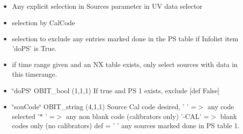 \begin{itemize}
\item Any explicit selection in Sources parameter in UV data selector \item selection by Cal\-Code \item selection to exclude any entries marked done in the PS table if Infolist item 'do\-PS' is True. \item if time range given and an NX table exists, only select sources with data in this timerange. 
\item \char`\"{}do\-PS\char`\"{} OBIT\_\-bool (1,1,1) If true and PS 1 exists, exclude [def False] \item \char`\"{}sou\-Code\char`\"{} OBIT\_\-string (4,1,1) Source Cal code desired, ' ' =$>$ any code selected '$\ast$ ' =$>$ any non blank code (calibrators only) '-CAL' =$>$ blank codes only (no calibrators) def = ' ' any sources marked done in PS table 1. 
\end{itemize}
